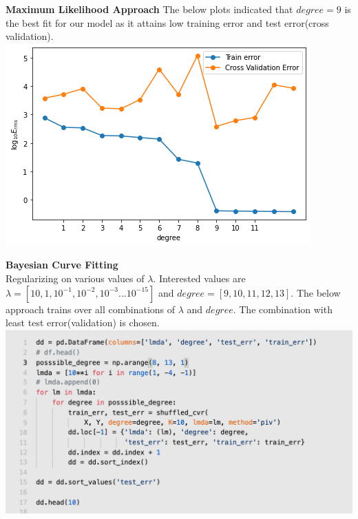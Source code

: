 \documentclass[11pt]{beamer}
\begin{document}
\begin{frame}
\textbf{Maximum Likelihood Approach}
The below plots indicated that $degree=9$ is the best fit for our model as it attains low training error and test error(cross validation).
\includegraphics[scale=0.5]{images/21.png}
\end{frame}



\begin{frame}
\textbf{Bayesian Curve Fitting}\\
Regularizing on various values of $\lambda$. 
Interested values are $\lambda=[10,1,10^{-1},10^{-2},10^{-3}...10^{-15}]$ and  $degree=[9,10,11,12,13]$.
The below approach trains over all combinations of $\lambda$ and $degree$. 
The combination with least test error(validation) is chosen.
\includegraphics[scale=0.40]{images/22.png}
\end{frame}
\end{document}
